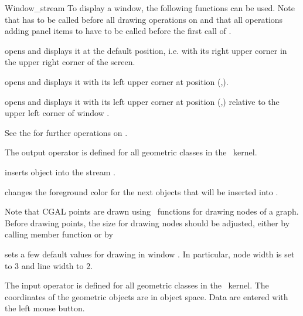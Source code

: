 \begin{ccClass} {Window_stream}
To display a window, the following functions can be used. Note that  
has to be called before all drawing operations on  and that all operations adding 
panel items to  have to be called before the first call of .

{opens  and displays it at the default position, i.e. 
with its right upper corner in the upper right corner of the screen.}

{opens  and displays it with its left upper corner at position
(,).}

{opens  and displays it with its left upper corner at position 
(,) relative to the upper left corner of  window .}

See the 
\cite{mnsu-lum} for further operations on .

\def\ccTagRmEigenClassName{\ccFalse}


The output operator is defined for all geometric classes in the \cgal\ kernel.

       {inserts object  into the stream \ccVar.}

       {changes the foreground color for the next objects that
        will be inserted into \ccVar.}

Note that CGAL points are drawn using \leda\ functions for drawing nodes of a graph.
Before drawing points, the size for drawing nodes should be adjusted, either by calling
member function  or by 

{sets a few default values for drawing in window . In particular, node width is
set to 3 and line width to 2.}



The input operator is defined for all geometric classes in the \cgal\ kernel.
The coordinates of the geometric objects are in object space. Data are
entered with the left mouse button.


\end{ccClass}

